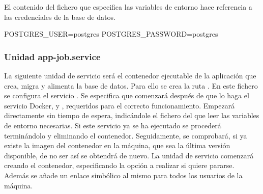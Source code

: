 El contenido del fichero que especifica las variables de entorno hace referencia a las credenciales de la base de datos.

\begin{codelisting}
\label{code:credentials}
\begin{code}
POSTGRES_USER=postgres
POSTGRES_PASSWORD=postgres
\end{code}
\end{codelisting}

\subsubsection{Unidad app-job.service}

La siguiente unidad de servicio será el contenedor ejecutable de la aplicación que crea, migra y alimenta la base de datos. Para ello se crea la ruta . En este fichero se configura el servicio . Se especifica que comenzará después de que lo haga el servicio Docker,  y , requeridos para el correcto funcionamiento. Empezará directamente sin tiempo de espera, indicándole el fichero del que leer las variables de entorno necesarias. Si este servicio ya se ha ejecutado se procederá terminándolo y eliminando el contenedor. Seguidamente, se comprobará, si ya existe la imagen del contenedor en la máquina, que sea la última versión disponible, de no ser así se obtendrá de nuevo. La unidad de servicio comenzará creando el contenedor, especificando la opción a realizar si quiere pararse. Además se añade un enlace simbólico al mismo para todos los usuarios de la máquina. 


